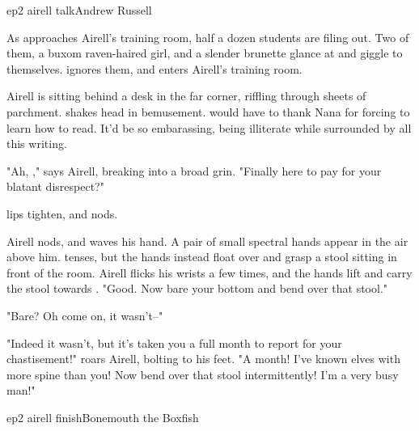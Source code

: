 \documentclass{book}
\begin{document}
\begin{childnode}{ep2 airell talk}{Andrew Russell}

    As \name{} approaches Airell's training room, half a dozen students are filing out. Two of them, a buxom raven-haired girl, and a slender brunette glance at \name{} and giggle to themselves.
    \name{} ignores them, and enters Airell's training room.

    Airell is sitting behind a desk in the far corner, riffling through sheets of parchment. \name{} shakes \hisher{} head in bemusement. \HeShe{} would have to thank Nana for forcing \himher{}
    to learn how to read. It'd be so embarassing, being illiterate while surrounded by all this writing.

    "Ah, \name{}," says Airell, breaking into a broad grin. "Finally here to pay for your blatant disrespect?"

    \names{} lips tighten, and \heshe{} nods.

    Airell nods, and waves his hand. A pair of small spectral hands appear in the air above him. \name{} tenses, but the hands instead float over and grasp a stool sitting in front
    of the room. Airell flicks his wrists a few times, and the hands lift and carry the stool towards \name{}. "Good. Now bare your bottom and bend over that stool."

    "Bare? Oh come on, it wasn't--"

    "Indeed it wasn't, but it's taken you a full month to report for your chastisement!" roars Airell, bolting to his feet. "A month! I've known elves with more spine than you! Now bend over that
    stool intermittently! I'm a very busy man!"


\end{childnode}

\begin{childnode}{ep2 airell finish}{Bonemouth the Boxfish}



\end{childnode}
\end{document}
